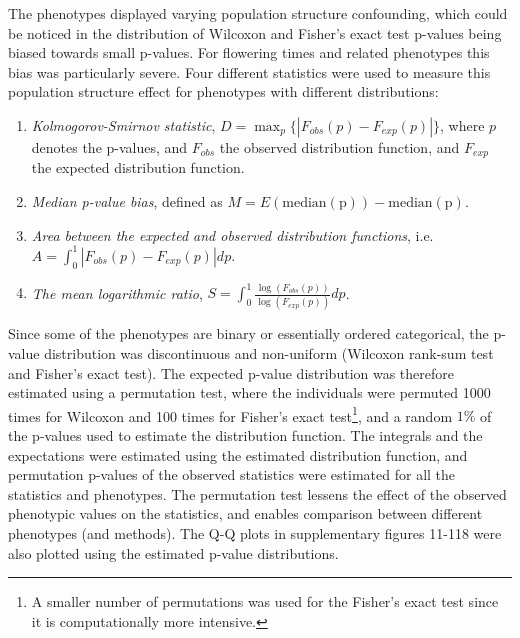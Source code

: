 \documentclass[10pt]{article}
\begin{document}
The phenotypes displayed varying population structure confounding, which could be noticed in the distribution of Wilcoxon and Fisher's exact test p-values being biased towards small
p-values.  For flowering times and related phenotypes this bias was particularly severe.   Four different statistics were used to measure this population structure effect for
phenotypes with different distributions:
\begin{enumerate}
\item \emph{Kolmogorov-Smirnov statistic}, $D=\max_p \{|F_{obs}(p)-F_{exp}(p)|\} $, where $p$ denotes the p-values, and $F_{obs}$ the observed distribution function, and $F_{exp}$ the expected distribution function.
\item \emph{Median p-value bias}, defined as $M=E(\textrm{median}(\textrm{p}))-\textrm{median}(\textrm{p})$.
\item \emph{Area between the expected and observed distribution functions}, i.e. $A = \int_{0}^{1}|F_{obs}(p)-F_{exp}(p)|dp$.
\item \emph{The mean logarithmic ratio}, $S=\int_{0}^{1}\frac{\log(F_{obs}(p))}{\log(F_{exp}(p))}dp$.
\end{enumerate}
Since some of the phenotypes are binary or essentially ordered categorical, the p-value distribution was discontinuous and non-uniform (Wilcoxon rank-sum test and Fisher's exact test).  The expected p-value distribution was therefore estimated using a permutation test, where the individuals were permuted 1000 times for Wilcoxon and 100 times for Fisher's exact test\footnote{A smaller number of permutations was used for the Fisher's exact test since it is computationally more intensive.}, and a random $1\%$ of the p-values used to estimate the distribution function.  The integrals and the expectations were estimated using the estimated distribution function, and permutation p-values of the observed statistics were estimated for all the statistics and phenotypes.  The permutation test lessens the effect of the observed phenotypic values on the statistics, and enables comparison between different phenotypes (and methods).  The Q-Q plots in supplementary figures 11-118 were also plotted using the estimated p-value distributions.
\end{document}
